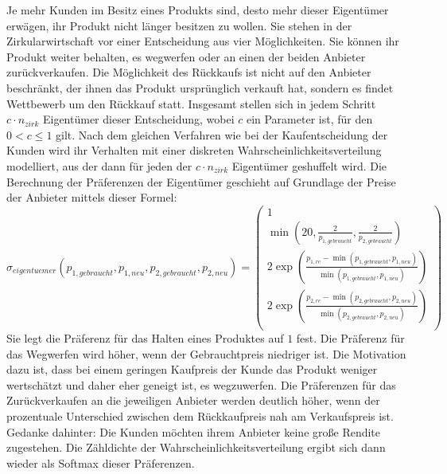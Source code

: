 Je mehr Kunden im Besitz eines Produkts sind, desto mehr dieser Eigentümer erwägen, ihr Produkt nicht länger besitzen zu wollen.
Sie stehen in der Zirkularwirtschaft vor einer Entscheidung aus vier Möglichkeiten.
Sie können ihr Produkt weiter behalten, es wegwerfen oder an einen der beiden Anbieter zurückverkaufen.
Die Möglichkeit des Rückkaufs ist nicht auf den Anbieter beschränkt, der ihnen das Produkt ursprünglich verkauft hat, sondern es findet Wettbewerb um den Rückkauf statt.
Insgesamt stellen sich in jedem Schritt $c \cdot n_{zirk}$ Eigentümer dieser Entscheidung, wobei $c$ ein Parameter ist, für den $0 < c \leq 1$ gilt.
Nach dem gleichen Verfahren wie bei der Kaufentscheidung der Kunden wird ihr Verhalten mit einer diskreten Wahrscheinlichkeitsverteilung modelliert, aus der dann für jeden der $c \cdot n_{zirk}$ Eigentümer geshuffelt wird.
Die Berechnung der Präferenzen der Eigentümer geschieht auf Grundlage der Preise der Anbieter mittels dieser Formel:
\begin{equation}
	\sigma_{eigentuemer}(p_{1, gebraucht}, p_{1, neu}, p_{2, gebraucht}, p_{2, neu})=
	\begin{pmatrix}
		1\\
		\min \left(20, \frac{2}{p_{1, gebraucht}},  \frac{2}{p_{2, gebraucht}}\right)\\
		2 \exp{\left(\frac{p_{1, re} - \min{(p_{1, gebraucht}, p_{1, neu})}}{\min{(p_{1, gebraucht}, p_{1, neu})}}\right)}\\
		2 \exp{\left(\frac{p_{2, re} - \min{(p_{2, gebraucht}, p_{2, neu})}}{\min{(p_{2, gebraucht}, p_{2, neu})}}\right)}\\
	\end{pmatrix}
\end{equation}
Sie legt die Präferenz für das Halten eines Produktes auf $1$ fest.
Die Präferenz für das Wegwerfen wird höher, wenn der Gebrauchtpreis niedriger ist.
Die Motivation dazu ist, dass bei einem geringen Kaufpreis der Kunde das Produkt weniger wertschätzt und daher eher geneigt ist, es wegzuwerfen.
Die Präferenzen für das Zurückverkaufen an die jeweiligen Anbieter werden deutlich höher, wenn der prozentuale Unterschied zwischen dem Rückkaufpreis nah am Verkaufspreis ist.
Gedanke dahinter: Die Kunden möchten ihrem Anbieter keine große Rendite zugestehen.
Die Zähldichte der Wahrscheinlichkeitsverteilung ergibt sich dann wieder als Softmax dieser Präferenzen.

